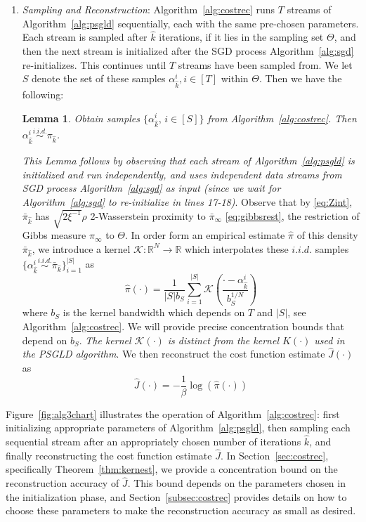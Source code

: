 \documentclass[journal,onecolumn]{IEEEtran}
\newtheorem{lemma}{Lemma}
\newcommand{\rew}{J}
\newcommand{\reals}{\mathbb{R}}
\newcommand{\dimn}{N}
\newcommand{\gibbs}{\ids_{\infty}}
\newcommand{\ids}{\pi}
\newcommand{\mk}{\mathcal{K}}
\newcommand{\wassprox}{\rho}
\newcommand{\zconst}{\xi}
\newcommand{\snum}{T}
\newcommand{\hk}{\hat{k}}
\begin{document}
{\begin{enumerate}[label=\roman*)]
\item \textit{Sampling and Reconstruction}: Algorithm~\ref{alg:costrec} runs $\snum$ streams of Algorithm~\ref{alg:psgld} sequentially, each with the same pre-chosen parameters. Each stream is sampled after $\hk$ iterations, if it lies in the sampling set $\Theta$, and then the next stream is initialized after the SGD process Algorithm~\ref{alg:sgd} re-initializes. This continues until $\snum$ streams have been sampled from. We let $S$ denote the set of these samples $\alpha_{\hk}^i, i\in[T]$ within $\Theta$. Then we have the following:
\begin{lemma}
\label{lem:iid}
Obtain samples $\{\alpha_{\hk}^i,\,i\in[S]\}$ from Algorithm~\ref{alg:costrec}. Then $\alpha_{\hk}^i \overset{i.i.d.}{\sim} \pi_{\hk}$.
\end{lemma}
\textit{This Lemma follows by observing that each stream of Algorithm~\ref{alg:psgld} is initialized and run independently, and uses independent data streams from SGD process Algorithm~\ref{alg:sgd} as input (since we wait for Algorithm~\ref{alg:sgd} to re-initialize in lines 17-18)}. Observe that by \eqref{eq:Zint}, $\bar{\pi}_{\hk}$ has $\sqrt{2\zconst^{-1}}\wassprox$ 2-Wasserstein proximity to $\bar{\pi}_{\infty}$ \eqref{eq:gibbsrest}, the restriction of Gibbs measure $\gibbs$ to $\Theta$. In order form an empirical estimate $\hat{\pi}$ of this density $\bar{\pi}_{\hk}$, we introduce a kernel $\mk: \reals^{\dimn} \to \reals$ which interpolates these $i.i.d.$ samples $\{\alpha_{\hk}^i \overset{i.i.d.}{\sim} \bar{\pi}_{\hk}\}_{i=1}^{|S|}$ as 
\[\hat{\pi}(\cdot) = \frac{1}{|S|b_{S}}\sum_{i=1}^{|S|}\mk\left(\frac{\cdot - \alpha_{\hk}^i}{b_{S}^{1/{\dimn}}}\right)\]
where $b_{S}$ is the kernel bandwidth which depends on $T$ and $|S|$, see Algorithm~\ref{alg:costrec}. We will provide precise concentration bounds that depend on $b_S$. \textit{The kernel $\mathcal{K}(\cdot)$ is distinct from the kernel $K(\cdot)$ used in the PSGLD algorithm}. We then reconstruct the cost function estimate $\hat{\rew}(\cdot)$ as \[\hat{\rew}(\cdot) = -\frac{1}{\beta}\log(\hat{\pi}(\cdot))\]
\end{enumerate}

Figure~\ref{fig:alg3chart} illustrates the operation of Algorithm~\ref{alg:costrec}: first initializing appropriate parameters of Algorithm~\ref{alg:psgld}, then sampling each sequential stream after an appropriately chosen number of iterations $\hk$, and finally reconstructing the cost function estimate $\hat{\rew}$. In Section~\ref{sec:costrec}, specifically Theorem~\ref{thm:kernest}, we provide a concentration bound on the reconstruction accuracy of $\hat{\rew}$. This bound depends on the parameters chosen in the initialization phase, and Section~\ref{subsec:costrec} provides details on how to choose these parameters to make the reconstruction accuracy as small as desired.
}
\end{document}
